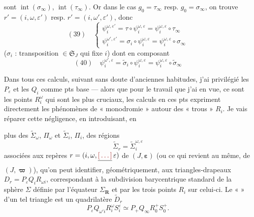 \documentclass[11pt,a4paper]{article}
\begin{document}
sont $\operatorname{int}(\sigma_\infty)$, $\operatorname{int}(\tau_\infty)$. Or dans le cas
$g_0 = \tau_\infty$ resp. $g_0 = \sigma_\infty$,  on trouve
$r' = (i, \omega, \varepsilon')$ resp. $r' = (i, \omega', \varepsilon')$, donc
\[
  (39)\quad
  \left\{
  \begin{array}{l}
    \psi_i^{\omega,\varepsilon'} = \tau \circ \psi_i^{\omega,\varepsilon}
      = \psi_i^{\omega,\varepsilon} \circ \tau_\infty \\[4pt]
    \psi_i^{\omega',\varepsilon'} = \sigma_i \circ \psi_i^{\omega,\varepsilon}
      = \psi_i^{\omega,\varepsilon} \circ \sigma_\infty
  \end{array}
  \right.
\]
($\sigma_i$ : transposition $\in \mathfrak{S}_J$ qui fixe $i$) dont en composant
\[
  (40)\quad
  \psi_i^{\omega',\varepsilon}
  = \widetilde{\sigma}_i \circ \psi_i^{\omega,\varepsilon}
  = \psi_i^{\omega,\varepsilon} \circ \widetilde{\sigma}_\infty
\]

Dans tous ces calculs, suivant sans doute d'anciennes habitudes, j'ai privilégié les
$P_\varepsilon$ et les $Q_i$ comme pts base — alors que pour le travail que j'ai en vue,
ce sont les points $R_i^{\omega}$ qui sont les plus cruciaux,  les calculs  en ces
pts expriment directement les phénomènes de « monodromie » autour des « trous » $R_i$.
Je vais réparer cette négligence, en introduisant, en

plus des $\widetilde{\Sigma}_\omega$, $\Pi_\omega$ et $\widetilde{\Sigma}_i$, $\Pi_i$, des
régions
\[
  \widetilde{\Sigma}_r = \widetilde{\Sigma}_i^{\omega,\varepsilon}
\]
associées aux repères $r = (i, \omega, \struck{\ill{}}\, \varepsilon)$ de
$(J, \boldsymbol{\varepsilon})$ (ou ce qui revient au même, de $(J, \boldsymbol{\varpi})$),
qu'on peut identifier, géométriquement, aux  triangles-drapeaux
$D_r = P_\varepsilon Q_i R_{\omega i}$, correspondant à la subdivision barycentrique
standard de la sphère $\Sigma$ définie par l'équateur $\Sigma_{\mathbf{R}}$ et par les trois
points $R_i$ sur celui-ci. Le «  »   d'un
tel triangle est un quadrilatère $\widetilde{D}_r$
\[
  P_\varepsilon Q_{\omega' i} R_i^{\omega} S_i^{\varepsilon}
  \simeq P_{+} Q_\infty R_0^{+} S_0^{+} .
\]
\end{document}
